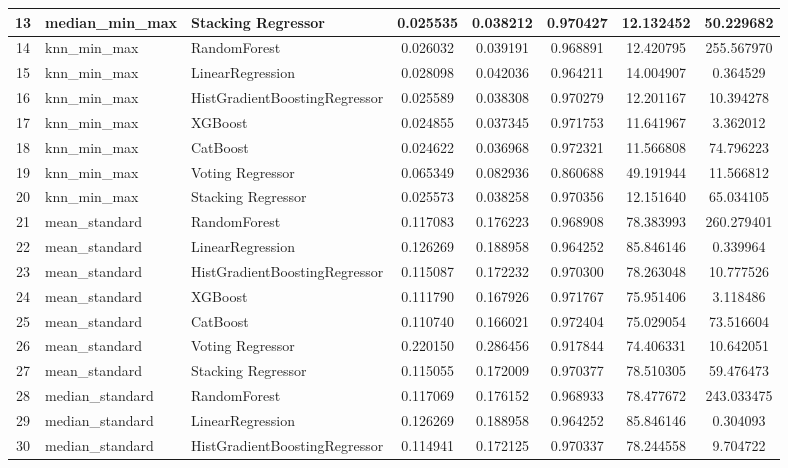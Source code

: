 \documentclass[10pt,letterpaper]{article}
\begin{document}
\begin{table}[H]
\begin{tabular}{|c|l|l|c|c|c|c|c|}
	13 & median\_min\_max & Stacking Regressor & 0.025535 & 0.038212 & 0.970427 & 12.132452 & 50.229682 \\ \hline
	14 & knn\_min\_max & RandomForest & 0.026032 & 0.039191 & 0.968891 & 12.420795 & 255.567970 \\ \hline
	15 & knn\_min\_max & LinearRegression & 0.028098 & 0.042036 & 0.964211 & 14.004907 & 0.364529 \\ \hline
	16 & knn\_min\_max & HistGradientBoostingRegressor & 0.025589 & 0.038308 & 0.970279 & 12.201167 & 10.394278 \\ \hline
	17 & knn\_min\_max & XGBoost & 0.024855 & 0.037345 & 0.971753 & 11.641967 & 3.362012 \\ \hline
	18 & knn\_min\_max & CatBoost & 0.024622 & 0.036968 & 0.972321 & 11.566808 & 74.796223 \\ \hline
	19 & knn\_min\_max & Voting Regressor & 0.065349 & 0.082936 & 0.860688 & 49.191944 & 11.566812 \\ \hline
	20 & knn\_min\_max & Stacking Regressor & 0.025573 & 0.038258 & 0.970356 & 12.151640 & 65.034105 \\ \hline
	21 & mean\_standard & RandomForest & 0.117083 & 0.176223 & 0.968908 & 78.383993 & 260.279401 \\ \hline
	22 & mean\_standard & LinearRegression & 0.126269 & 0.188958 & 0.964252 & 85.846146 & 0.339964 \\ \hline
	23 & mean\_standard & HistGradientBoostingRegressor & 0.115087 & 0.172232 & 0.970300 & 78.263048 & 10.777526 \\ \hline
	24 & mean\_standard & XGBoost & 0.111790 & 0.167926 & 0.971767 & 75.951406 & 3.118486 \\ \hline
	25 & mean\_standard & CatBoost & 0.110740 & 0.166021 & 0.972404 & 75.029054 & 73.516604 \\ \hline
	26 & mean\_standard & Voting Regressor & 0.220150 & 0.286456 & 0.917844 & 74.406331 & 10.642051 \\ \hline
	27 & mean\_standard & Stacking Regressor & 0.115055 & 0.172009 & 0.970377 & 78.510305 & 59.476473 \\ \hline
	28 & median\_standard & RandomForest & 0.117069 & 0.176152 & 0.968933 & 78.477672 & 243.033475 \\ \hline
	29 & median\_standard & LinearRegression & 0.126269 & 0.188958 & 0.964252 & 85.846146 & 0.304093 \\ \hline
	30 & median\_standard & HistGradientBoostingRegressor & 0.114941 & 0.172125 & 0.970337 & 78.244558 & 9.704722 \\ \hline

\end{tabular}
\end{table}
\end{document}
